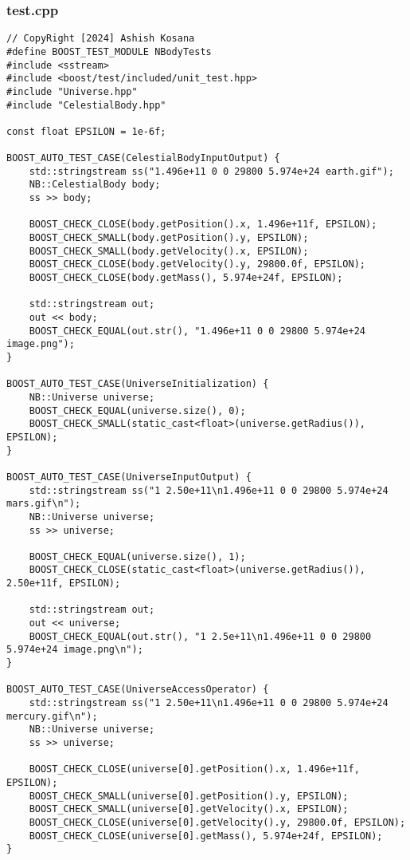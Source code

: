 \documentclass[12pt]{article}
\begin{document}
\subsubsection{test.cpp}
\begin{lstlisting}[style=cppcode]
// CopyRight [2024] Ashish Kosana
#define BOOST_TEST_MODULE NBodyTests
#include <sstream>
#include <boost/test/included/unit_test.hpp>
#include "Universe.hpp"
#include "CelestialBody.hpp"

const float EPSILON = 1e-6f;

BOOST_AUTO_TEST_CASE(CelestialBodyInputOutput) {
    std::stringstream ss("1.496e+11 0 0 29800 5.974e+24 earth.gif");
    NB::CelestialBody body;
    ss >> body;

    BOOST_CHECK_CLOSE(body.getPosition().x, 1.496e+11f, EPSILON);
    BOOST_CHECK_SMALL(body.getPosition().y, EPSILON);
    BOOST_CHECK_SMALL(body.getVelocity().x, EPSILON);
    BOOST_CHECK_CLOSE(body.getVelocity().y, 29800.0f, EPSILON);
    BOOST_CHECK_CLOSE(body.getMass(), 5.974e+24f, EPSILON);

    std::stringstream out;
    out << body;
    BOOST_CHECK_EQUAL(out.str(), "1.496e+11 0 0 29800 5.974e+24 image.png");
}

BOOST_AUTO_TEST_CASE(UniverseInitialization) {
    NB::Universe universe;
    BOOST_CHECK_EQUAL(universe.size(), 0);
    BOOST_CHECK_SMALL(static_cast<float>(universe.getRadius()), EPSILON);
}

BOOST_AUTO_TEST_CASE(UniverseInputOutput) {
    std::stringstream ss("1 2.50e+11\n1.496e+11 0 0 29800 5.974e+24 mars.gif\n");
    NB::Universe universe;
    ss >> universe;

    BOOST_CHECK_EQUAL(universe.size(), 1);
    BOOST_CHECK_CLOSE(static_cast<float>(universe.getRadius()), 2.50e+11f, EPSILON);

    std::stringstream out;
    out << universe;
    BOOST_CHECK_EQUAL(out.str(), "1 2.5e+11\n1.496e+11 0 0 29800 5.974e+24 image.png\n");
}

BOOST_AUTO_TEST_CASE(UniverseAccessOperator) {
    std::stringstream ss("1 2.50e+11\n1.496e+11 0 0 29800 5.974e+24 mercury.gif\n");
    NB::Universe universe;
    ss >> universe;

    BOOST_CHECK_CLOSE(universe[0].getPosition().x, 1.496e+11f, EPSILON);
    BOOST_CHECK_SMALL(universe[0].getPosition().y, EPSILON);
    BOOST_CHECK_SMALL(universe[0].getVelocity().x, EPSILON);
    BOOST_CHECK_CLOSE(universe[0].getVelocity().y, 29800.0f, EPSILON);
    BOOST_CHECK_CLOSE(universe[0].getMass(), 5.974e+24f, EPSILON);
}


\end{lstlisting}
\end{document}
